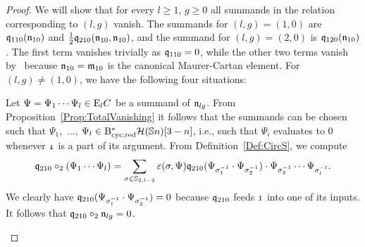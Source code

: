 \documentclass[\MainFolder/Text.tex]{subfiles}
\begin{document}
\begin{proof}
%
We will show that for every $l\ge 1$, $g\ge 0$ all summands in the relation corresponding to $(l,g)$ vanish. The summands for $(l,g)= (1,0)$ are $\mathfrak{q}_{110}(\mathfrak{n}_{10})$ and $\frac{1}{2}\mathfrak{q}_{210}(\mathfrak{n}_{10},\mathfrak{n}_{10})$, and the summand for $(l,g)=(2,0)$ is $\mathfrak{q}_{120}(\mathfrak{n}_{10})$.
The first term vanishes trivially as $\mathfrak{q}_{110}=0$, while the other two terms vanish by~\cite[Proposition 12.5]{Cieliebak2015} because $\mathfrak{n}_{10} = \mathfrak{m}_{10}$
is the canonical Maurer-Cartan element. For $(l,g)\neq (1,0)$, we have the following four situations:
\begin{description}[font=\normalfont\itshape]
\item[$\OPQ_{210}\circ_2 \PMC_{lg}$, $l\ge 2$:] 
Let $\Psi = \Psi_1 \cdots \Psi_l\in \mathrm{E}_l C$ be a summand of $\mathfrak{n}_{lg}$. 
 From Proposition~\ref{Prop:TotalVanishing} it follows that the summands can be chosen such that $\Psi_1$,~$\dotsc$, $\Psi_l \in \mathrm{B}_{\mathrm{cyc},\mathrm{red}}^*\mathcal{H}(\mathbb{S}{n})[3-n]$, i.e., such that $\Psi_i$ evaluates to $0$ whenever $\NOne$ is a part of its argument. From Definition~\ref{Def:CircS}, we compute
$$\mathfrak{q}_{210}\circ_2 (\Psi_1\cdots\Psi_l) = \sum_{\sigma\in \mathbb{S}_{2,l-2}} \varepsilon(\sigma,\Psi)\mathfrak{q}_{210}(\Psi_{\sigma_1^{-1}}\cdot\Psi_{\sigma_2^{-1}})\cdot\Psi_{\sigma_3^{-1}}\cdots \Psi_{\sigma_l^{-l}}. $$
We clearly have $\mathfrak{q}_{210}(\Psi_{\sigma_1^{-1}}\cdot\Psi_{\sigma_2^{-1}})=0$ because $\mathfrak{q}_{210}$ feeds $\NOne$ into one of its inputs. It follows that $\mathfrak{q}_{210}\circ_2 \mathfrak{n}_{lg} = 0$.


\end{description}
\end{proof}
\end{document}
